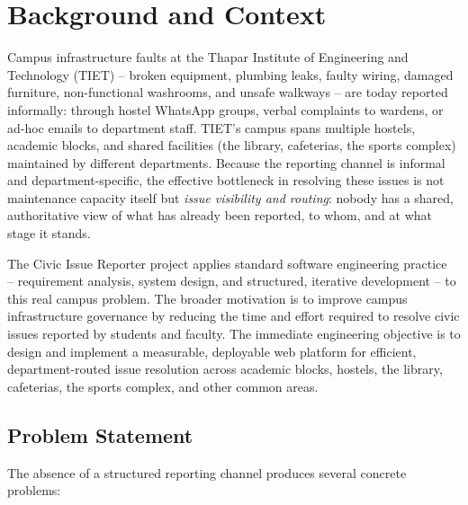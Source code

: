 \documentclass[11pt]{report}
\newcommand{\sysname}{Civic Issue Reporter\xspace}
\begin{document}
\section{Background and Context}

Campus infrastructure faults at the Thapar Institute of Engineering and
Technology (TIET) -- broken equipment, plumbing leaks, faulty wiring,
damaged furniture, non-functional washrooms, and unsafe walkways -- are
today reported informally: through hostel WhatsApp groups, verbal
complaints to wardens, or ad-hoc emails to department staff. TIET's
campus spans multiple hostels, academic blocks, and shared facilities
(the library, cafeterias, the sports complex) maintained by different
departments. Because the reporting channel is informal and
department-specific, the effective bottleneck in resolving these issues
is not maintenance capacity itself but \emph{issue visibility and
routing}: nobody has a shared, authoritative view of what has already
been reported, to whom, and at what stage it stands.

The \sysname project applies standard software engineering
practice~\cite{sommerville2016} -- requirement analysis, system design,
and structured, iterative development -- to this real campus problem. The broader
motivation is to improve campus infrastructure governance by reducing
the time and effort required to resolve civic issues reported by
students and faculty. The immediate engineering objective is to design
and implement a measurable, deployable web platform for efficient,
department-routed issue resolution across academic blocks, hostels, the
library, cafeterias, the sports complex, and other common areas.

\subsection{Problem Statement}

The absence of a structured reporting channel produces several concrete
problems:
\end{document}
